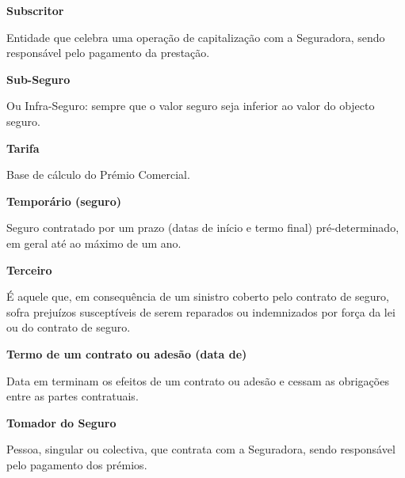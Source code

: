 \begin{description}
\item \textbf{Subscritor}

Entidade que celebra uma operação de capitalização com a Seguradora, sendo responsável pelo pagamento da prestação.
\end{description}

\begin{description}
\item \textbf{Sub-Seguro}

Ou Infra-Seguro: sempre que o valor seguro seja inferior ao valor do objecto seguro.
\end{description}

\begin{description}
\item \textbf{Tarifa}

Base de cálculo do Prémio Comercial.
\end{description}

\begin{description}
\item \textbf{Temporário (seguro)}

Seguro contratado por um prazo (datas de início e termo final) pré-determinado, em geral até ao máximo de um ano.
\end{description}

\begin{description}
\item \textbf{Terceiro}

É aquele que, em consequência de um sinistro coberto pelo contrato de seguro, sofra prejuízos susceptíveis de serem reparados ou indemnizados por força da lei ou do contrato de seguro.
\end{description}

\begin{description}
\item \textbf{Termo de um contrato ou adesão (data de)}

Data em terminam os efeitos de um contrato ou adesão e cessam as obrigações entre as partes contratuais.
\end{description}

\begin{description}
\item \textbf{Tomador do Seguro}

Pessoa, singular ou colectiva, que contrata com a Seguradora, sendo responsável pelo pagamento dos prémios.
\end{description}


